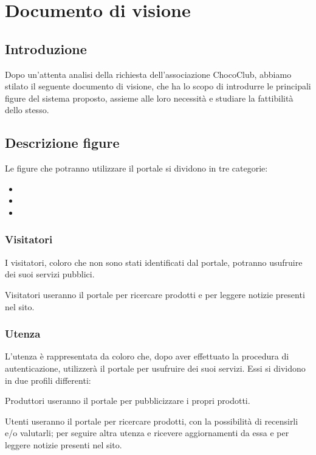 \chapter{Documento di visione} 
\label{cha:documento_di_visione}

\section{Introduzione}
\label{sec:introduzione}
Dopo un'attenta analisi della richiesta dell'associazione ChocoClub, abbiamo stilato il seguente documento di visione, che ha lo scopo di introdurre le principali figure del sistema proposto, assieme alle loro necessità e studiare la fattibilità dello stesso.

\section{Descrizione figure} 
\label{sec:descrizionefigure}
Le figure che potranno utilizzare il portale si dividono in tre categorie:
\begin{itemize}
	\item {}
	\item {}
	\item {}
\end{itemize}

\subsection{Visitatori} %
\label{sub:}
I visitatori, coloro che non sono stati identificati dal portale, potranno usufruire dei suoi servizi pubblici.
\begin{descriptionInd}
    \item[Visitatori] useranno il portale per ricercare prodotti e per leggere notizie presenti nel sito.
\end{descriptionInd}



\subsection{Utenza}
\label{sub:utenza}
L'utenza è rappresentata da coloro che, dopo aver effettuato la procedura di autenticazione, utilizzerà il portale per usufruire dei suoi servizi. Essi si dividono in due profili differenti:
\begin{descriptionInd}
    \item[Produttori] useranno il portale per pubblicizzare i propri prodotti.

    \item[Utenti] useranno il portale per ricercare prodotti, con la possibilità di recensirli e/o valutarli; per seguire altra utenza e ricevere aggiornamenti da essa e per leggere notizie presenti nel sito.
\end{descriptionInd}




